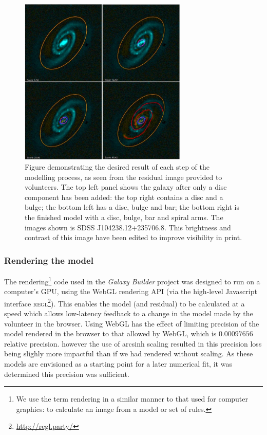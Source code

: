 \documentclass[../main.tex]{subfiles}
\begin{document}
\begin{figure}
  \includegraphics[width=8cm]{images/residualProgress.jpg}
  \caption{Figure demonstrating the desired result of each step of the modelling process, as seen from the residual image provided to volunteers. The top left panel shows the galaxy after only a disc component has been added: the top right contains a disc and a bulge; the bottom left has a disc, bulge and bar; the bottom right is the finished model with a disc, bulge, bar and spiral arms. The images shown is SDSS J104238.12+235706.8. This brightness and contrast of this image have been edited to improve visibility in print.}
  \label{fig:residualsStepByStep}
\end{figure}

\subsubsection{Rendering the model}


The rendering\footnote{We use the term rendering in a similar manner to that used for computer graphics: to calculate an image from a model or set of rules.} code used in the \textit{Galaxy Builder} project was designed to run on a computer's GPU, using the WebGL rendering API (via the high-level Javascript interface \textsc{regl}\footnote{\url{http://regl.party/}}). This enables the model (and residual) to be calculated at a speed which allows low-latency feedback to a change in the model made by the volunteer in the browser. Using WebGL has the effect of limiting precision of the model rendered in the browser to that allowed by WebGL, which is $0.00097656$ relative precision. however the use of arcsinh scaling resulted in this precision loss being slighly more impactful than if we had rendered without scaling. As these models are envisioned as a starting point for a later numerical fit, it was determined this precision was sufficient.
\end{document}

